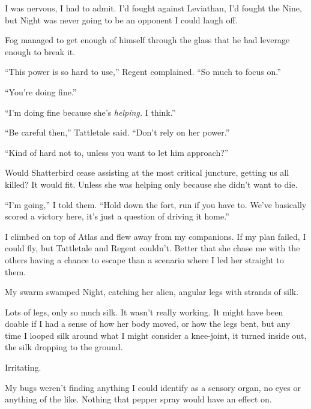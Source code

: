 I was nervous, I had to admit.  I'd fought against Leviathan, I'd fought the Nine, but Night was never going to be an opponent I could laugh off.



Fog managed to get enough of himself through the glass that he had leverage enough to break it.



``This power is so hard to use,'' Regent complained.  ``So much to focus on.''



``You're doing fine.''



``I'm doing fine because she's \emph{helping.  }I think.''



``Be careful then,'' Tattletale said.  ``Don't rely on her power.''



``Kind of hard not to, unless you want to let him approach?''



Would Shatterbird cease assisting at the most critical juncture, getting us all killed?  It would fit.  Unless she was helping only because she didn't want to die.



``I'm going,'' I told them.  ``Hold down the fort, run if you have to.  We've basically scored a victory here, it's just a question of driving it home.''



I climbed on top of Atlas and flew away from my companions.  If my plan failed, I could fly, but Tattletale and Regent couldn't.  Better that she chase me with the others having a chance to escape than a scenario where I led her straight to them.



My swarm swamped Night, catching her alien, angular legs with strands of silk.



Lots of legs, only so much silk.  It wasn't really working.  It might have been doable if I had a sense of how her body moved, or how the legs bent, but any time I looped silk around what I might consider a knee-joint, it turned inside out, the silk dropping to the ground.



Irritating.



My bugs weren't finding anything I could identify as a sensory organ, no eyes or anything of the like.  Nothing that pepper spray would have an effect on.



